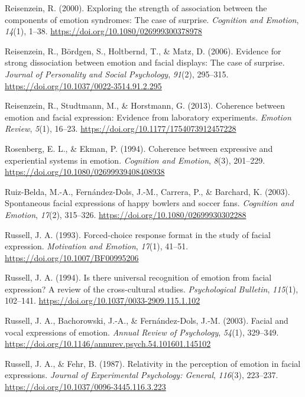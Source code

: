 \documentclass[
  english,
  doc]{apa7}
\newlength{\cslhangindent}
\newenvironment{cslreferences}%
  {\setlength{\parindent}{0pt}%
  \everypar{\setlength{\hangindent}{\cslhangindent}}\ignorespaces}%
  {\par}
\begin{document}
\begin{cslreferences}
\leavevmode\hypertarget{ref-reisenzein2000exploring}{}%
Reisenzein, R. (2000). Exploring the strength of association between the components of emotion syndromes: The case of surprise. \emph{Cognition and Emotion}, \emph{14}(1), 1--38. \url{https://doi.org/10.1080/026999300378978}

\leavevmode\hypertarget{ref-reisenzein2006evidence}{}%
Reisenzein, R., Bördgen, S., Holtbernd, T., \& Matz, D. (2006). Evidence for strong dissociation between emotion and facial displays: The case of surprise. \emph{Journal of Personality and Social Psychology}, \emph{91}(2), 295--315. \url{https://doi.org/10.1037/0022-3514.91.2.295}

\leavevmode\hypertarget{ref-reisenzein2013coherence}{}%
Reisenzein, R., Studtmann, M., \& Horstmann, G. (2013). Coherence between emotion and facial expression: Evidence from laboratory experiments. \emph{Emotion Review}, \emph{5}(1), 16--23. \url{https://doi.org/10.1177/1754073912457228}

\leavevmode\hypertarget{ref-rosenberg1994coherence}{}%
Rosenberg, E. L., \& Ekman, P. (1994). Coherence between expressive and experiential systems in emotion. \emph{Cognition and Emotion}, \emph{8}(3), 201--229. \url{https://doi.org/10.1080/02699939408408938}

\leavevmode\hypertarget{ref-ruiz2003spontaneous}{}%
Ruiz-Belda, M.-A., Fernández-Dols, J.-M., Carrera, P., \& Barchard, K. (2003). Spontaneous facial expressions of happy bowlers and soccer fans. \emph{Cognition and Emotion}, \emph{17}(2), 315--326. \url{https://doi.org/10.1080/02699930302288}

\leavevmode\hypertarget{ref-russell1993forced}{}%
Russell, J. A. (1993). Forced-choice response format in the study of facial expression. \emph{Motivation and Emotion}, \emph{17}(1), 41--51. \url{https://doi.org/10.1007/BF00995206}

\leavevmode\hypertarget{ref-russell1994there}{}%
Russell, J. A. (1994). Is there universal recognition of emotion from facial expression? A review of the cross-cultural studies. \emph{Psychological Bulletin}, \emph{115}(1), 102--141. \url{https://doi.org/10.1037/0033-2909.115.1.102}

\leavevmode\hypertarget{ref-russell2003facial}{}%
Russell, J. A., Bachorowski, J.-A., \& Fernández-Dols, J.-M. (2003). Facial and vocal expressions of emotion. \emph{Annual Review of Psychology}, \emph{54}(1), 329--349. \url{https://doi.org/10.1146/annurev.psych.54.101601.145102}

\leavevmode\hypertarget{ref-russell1987relativity}{}%
Russell, J. A., \& Fehr, B. (1987). Relativity in the perception of emotion in facial expressions. \emph{Journal of Experimental Psychology: General}, \emph{116}(3), 223--237. \url{https://doi.org/10.1037/0096-3445.116.3.223}


\end{cslreferences}
\end{document}
